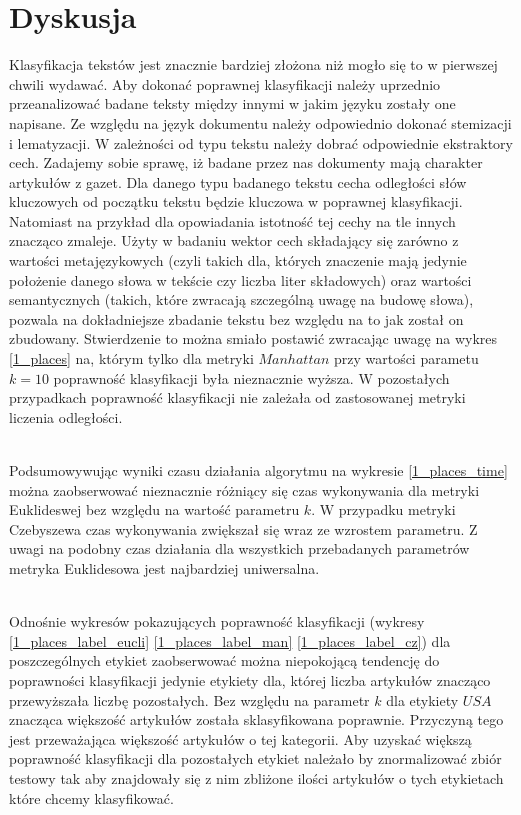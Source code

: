 \documentclass{classrep}
\begin{document}
\section{Dyskusja}
Klasyfikacja tekstów jest znacznie bardziej złożona niż mogło się to w pierwszej chwili wydawać.
Aby dokonać poprawnej klasyfikacji należy uprzednio przeanalizować badane teksty między innymi w jakim
języku zostały one napisane. Ze względu na język dokumentu należy odpowiednio dokonać stemizacji i
lematyzacji. W zależności od typu tekstu należy dobrać odpowiednie ekstraktory cech.
Zadajemy sobie sprawę, iż badane przez nas dokumenty mają charakter artykułów z gazet. Dla danego typu
badanego tekstu cecha odległości słów kluczowych od początku tekstu będzie kluczowa w poprawnej
klasyfikacji. Natomiast na przykład dla opowiadania istotność tej cechy na tle innych znacząco zmaleje.
Użyty w badaniu wektor cech składający się zarówno z wartości metajęzykowych (czyli takich dla, których
znaczenie mają jedynie położenie danego słowa w tekście czy liczba liter składowych) oraz wartości
semantycznych (takich, które zwracają szczególną uwagę na budowę słowa), pozwala na dokładniejsze
zbadanie tekstu bez względu na to jak został on zbudowany. Stwierdzenie to można smiało postawić
zwracając uwagę na wykres \ref{1_places} na, którym tylko dla metryki $Manhattan$ przy wartości
parametu $k=10$ poprawność klasyfikacji była nieznacznie wyższa. W pozostałych przypadkach poprawność
klasyfikacji nie zależała od zastosowanej metryki liczenia odległości.

\\Podsumowywując wyniki czasu działania algorytmu na wykresie \ref{1_places_time} można zaobserwować
nieznacznie różniący się czas wykonywania dla metryki Euklideswej bez względu na wartość parametru $k$.
W przypadku metryki Czebyszewa czas wykonywania zwiększał się wraz ze wzrostem parametru.
Z uwagi na podobny czas działania dla wszystkich przebadanych parametrów metryka Euklidesowa
jest najbardziej uniwersalna.

\\Odnośnie wykresów pokazujących poprawność klasyfikacji (wykresy \ref{1_places_label_eucli}
\ref{1_places_label_man} \ref{1_places_label_cz}) dla poszczególnych etykiet zaobserwować można
niepokojącą tendencję do poprawności klasyfikacji jedynie etykiety dla, której liczba artykułów
znacząco przewyższała liczbę pozostałych. Bez względu na parametr $k$ dla etykiety $USA$ znacząca
większość artykułów została sklasyfikowana poprawnie. Przyczyną tego jest przeważająca większość
artykułów o tej kategorii. Aby uzyskać większą poprawność klasyfikacji
dla pozostałych etykiet należało by znormalizować zbiór testowy tak aby znajdowały się z nim
zbliżone ilości artykułów o tych etykietach które chcemy klasyfikować.
\end{document}
